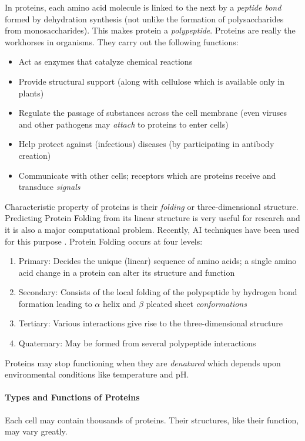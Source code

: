 In proteins, each amino acid molecule is linked to the next by a \emph{peptide bond} formed by dehydration synthesis (not unlike the formation of polysaccharides from monosaccharides). This makes protein a \emph{polypeptide}. Proteins are really the workhorses in organisms. They carry out the following functions:
\begin{itemize}
    \item Act as enzymes that catalyze chemical reactions
    \item Provide structural support (along with cellulose which is available only in plants)
    \item Regulate the passage of substances across the cell membrane (even viruses and other pathogens may \emph{attach} to proteins to enter cells)
    \item Help protect against (infectious) diseases (by participating in antibody creation)
    \item Communicate with other cells; receptors which are proteins receive and transduce \emph{signals}
\end{itemize}

Characteristic property of proteins is their \emph{folding} or three-dimensional structure. Predicting Protein Folding from its linear structure is very useful for research and it is also a major computational problem. Recently, AI techniques have been used for this purpose \cite{alphafold}. Protein Folding occurs at four levels:
\begin{enumerate}
    \item Primary: Decides the unique (linear) sequence of amino acids; a single amino acid change in a protein can alter its structure and function
    \item Secondary: Consists of the local folding of the polypeptide by hydrogen bond formation leading to $\alpha$ helix and $\beta$ pleated sheet \emph{conformations}
    \item Tertiary: Various interactions give rise to the three-dimensional structure
    \item Quaternary: May be formed from several polypeptide interactions
\end{enumerate}

Proteins may stop functioning when they are \emph{denatured} which depends upon environmental conditions like temperature and pH.

\paragraph{Types and Functions of Proteins}
Each cell may contain thousands of proteins. Their structures, like their function, may vary greatly. 

